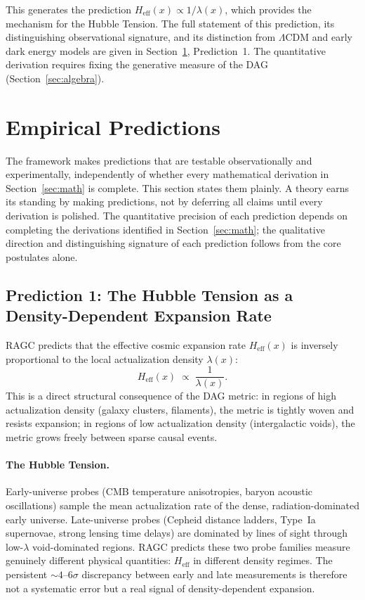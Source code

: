 \documentclass[11pt,a4paper]{article}
\theoremstyle{plain}
\theoremstyle{definition}
\theoremstyle{remark}
\begin{document}
This generates the prediction $H_{\mathrm{eff}}(x) \propto 1/\lambda(x)$, which
provides the mechanism for the Hubble Tension. The full statement of this
prediction, its distinguishing observational signature, and its distinction from
$\Lambda$CDM and early dark energy models are given in
Section~\ref{sec:predictions}, Prediction~1. The quantitative derivation requires
fixing the generative measure of the DAG (Section~\ref{sec:algebra}).

\section{Empirical Predictions}
\label{sec:predictions}

The framework makes predictions that are testable observationally and experimentally,
independently of whether every mathematical derivation in Section~\ref{sec:math}
is complete. This section states them plainly. A theory earns its standing by
making predictions, not by deferring all claims until every derivation is polished.
The quantitative precision of each prediction depends on completing the derivations
identified in Section~\ref{sec:math}; the qualitative direction and distinguishing
signature of each prediction follows from the core postulates alone.

\subsection{Prediction 1: The Hubble Tension as a Density-Dependent Expansion Rate}

RAGC predicts that the effective cosmic expansion rate $H_{\mathrm{eff}}(x)$ is
inversely proportional to the local actualization density $\lambda(x)$:
\begin{equation}
  H_{\mathrm{eff}}(x) \;\propto\; \frac{1}{\lambda(x)}.
  \label{eq:hubble_pred}
\end{equation}
This is a direct structural consequence of the DAG metric: in regions of high
actualization density (galaxy clusters, filaments), the metric is tightly woven
and resists expansion; in regions of low actualization density (intergalactic
voids), the metric grows freely between sparse causal events.

\paragraph{The Hubble Tension.}
Early-universe probes (CMB temperature anisotropies, baryon acoustic oscillations)
sample the mean actualization rate of the dense, radiation-dominated early universe.
Late-universe probes (Cepheid distance ladders, Type~Ia supernovae, strong lensing
time delays) are dominated by lines of sight through low-$\lambda$ void-dominated
regions. RAGC predicts these two probe families measure genuinely different physical
quantities: $H_{\mathrm{eff}}$ in different density regimes. The persistent
$\sim\!4$--$6\sigma$ discrepancy between early and late measurements is therefore
not a systematic error but a real signal of density-dependent expansion.
\end{document}
